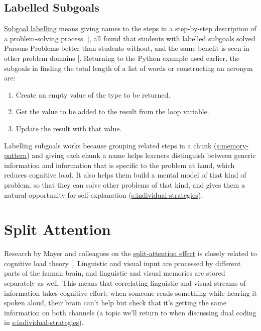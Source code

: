 \subsection{Labelled Subgoals}\label{labelled-subgoals}

\protect\hyperlink{g:subgoal-labelling}{Subgoal labelling} means giving names
to the steps in a step-by-step description of a problem-solving process.
{[},\protect[\hyperlink{b:Morr2016}{Morr2016}]{]} all found that students with labelled
subgoals solved Parsons Problems better than students without, and the
same benefit is seen in other problem domains {[}\protect[\hyperlink{b:Marg2012}{Marg2012}]{]}.
Returning to the Python example used earlier, the subgoals in finding
the total length of a list of words or constructing an acronym are:

\begin{enumerate}
\item
  Create an empty value of the type to be returned.
\item
  Get the value to be added to the result from the loop variable.
\item
  Update the result with that value.
\end{enumerate}

Labelling subgoals works because grouping related steps in a chunk
(\protect\hyperlink{SECTION}{s:memory-pattern}) and giving each chunk a name helps
learners distinguish between generic information and information that is
specific to the problem at hand, which reduces cognitive load. It also
helps them build a mental model of that kind of problem, so that they
can solve other problems of that kind, and gives them a natural
opportunity for self-explanation (\protect\hyperlink{SECTION}{s:individual-strategies}).

\section{Split Attention}\label{s:load-split-attention}

Research by Mayer and colleagues on the
\protect\hyperlink{g:split-attention-effect}{split-attention effect} is
closely related to cognitive load theory {[}\protect[\hyperlink{b:Maye2003}{Maye2003}]{]}. Linguistic
and visual input are processed by different parts of the human brain,
and linguistic and visual memories are stored separately as well. This
means that correlating linguistic and visual streams of information
takes cognitive effort: when someone reads something while hearing it
spoken aloud, their brain can't help but check that it's getting the
same information on both channels (a topic we'll return to when
discussing dual coding in \protect\hyperlink{SECTION}{s:individual-strategies}).

